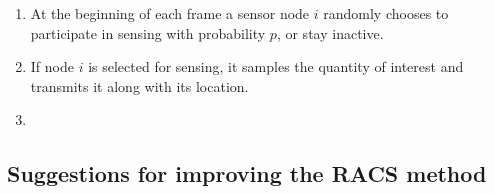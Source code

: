 \documentclass[Main]{subfiles}
\begin{document}
			\begin{enumerate}[label=\bfseries Step \arabic*:]
				\item 
					At the beginning of each frame a sensor node $i$ randomly chooses to participate in sensing with probability $p$, or stay inactive.
				\item 
					If node $i$ is selected for sensing, it samples the quantity of interest and transmits it along with its location.
				\item 

			\end{enumerate}


		



		\subsection{Suggestions for improving the RACS method} %
		\label{sub:suggestions_for_improving_the_racs_method}
		



\end{document}
